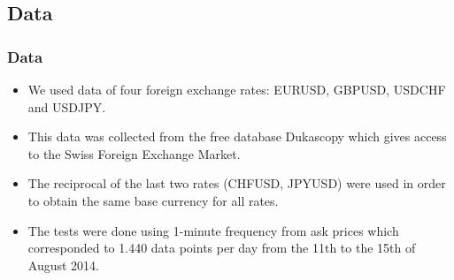 \documentclass[xcolor=dvipsnames]{beamer}
\begin{document}
%    
%    
%    





\subsection{Data}
\begin{frame}
\frametitle{Data}
\begin{itemize}
\item We used data of four foreign exchange rates: EURUSD, GBPUSD, USDCHF and USDJPY. 
\item This data was collected from the free database Dukascopy which gives access to
the Swiss Foreign Exchange Market.
\item The reciprocal of the last two rates (CHFUSD, JPYUSD) were used in order to
obtain the same base currency for all rates. 
\item The tests were done using
1-minute frequency from ask prices which corresponded to 1.440 data points per
day from the 11th to the 15th of August 2014.
\end{itemize}
\end{frame}
\end{document}
